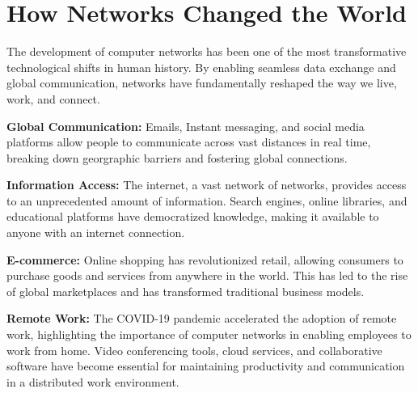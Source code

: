 \section{How Networks Changed the World}
The development of computer networks has been one of the most transformative technological shifts in human history. By enabling seamless data exchange and global communication, networks have fundamentally reshaped the way we live, work, and connect.

\begin{description}
    \item \textbf{Global Communication:} Emails, Instant messaging, and social media platforms allow people to communicate across vast distances in real time, breaking down georgraphic barriers and fostering global connections.
    \item \textbf{Information Access:} The internet, a vast network of networks, provides access to an unprecedented amount of information. Search engines, online libraries, and educational platforms have democratized knowledge, making it available to anyone with an internet connection.
    \item \textbf{E-commerce:} Online shopping has revolutionized retail, allowing consumers to purchase goods and services from anywhere in the world. This has led to the rise of global marketplaces and has transformed traditional business models.
    \item \textbf{Remote Work:} The COVID-19 pandemic accelerated the adoption of remote work, highlighting the importance of computer networks in enabling employees to work from home. Video conferencing tools, cloud services, and collaborative software have become essential for maintaining productivity and communication in a distributed work environment.
\end{description}